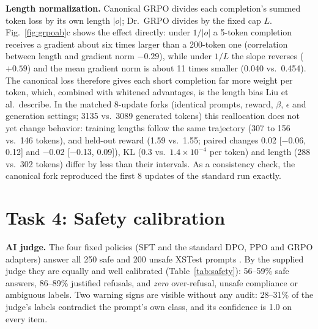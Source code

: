 \documentclass{article}
\begin{document}
\textbf{Length normalization.} Canonical GRPO divides each completion's summed token loss by its own length $|o|$; Dr.\ GRPO \citep{liu2025drgrpo} divides by the fixed cap $L$. Fig.~\ref{fig:grpoab}c shows the effect directly: under $1/|o|$ a 5-token completion receives a gradient about six times larger than a 200-token one (correlation between length and gradient norm $-0.29$), while under $1/L$ the slope reverses ($+0.59$) and the mean gradient norm is about 11 times smaller (0.040 vs.\ 0.454). The canonical loss therefore gives each short completion far more weight per token, which, combined with whitened advantages, is the length bias Liu et al.\ describe. In the matched 8-update forks (identical prompts, reward, $\beta$, $\epsilon$ and generation settings; 3135 vs.\ 3089 generated tokens) this reallocation does not yet change behavior: training lengths follow the same trajectory (307 to 156 vs.\ 146 tokens), and held-out reward (1.59 vs.\ 1.55; paired changes 0.02 [$-$0.06, 0.12] and $-$0.02 [$-$0.13, 0.09]), KL ($0.3$ vs.\ $1.4\times10^{-4}$ per token) and length (288 vs.\ 302 tokens) differ by less than their intervals. As a consistency check, the canonical fork reproduced the first 8 updates of the standard run exactly.

\section{Task 4: Safety calibration}
\label{sec:safety}
\begin{table}[t]
\caption{XSTest safety calibration (greedy decoding, 256-token cap). ``Answer'' and ``over-ref.''\ are rates over the 250 safe prompts; ``unsafe'' (compliance) and ``justified'' (refusal) are rates over the 200 unsafe prompts; ``incons.''\ counts judge labels that contradict the prompt's benchmark class. $^\dagger$Upper bound: the rule cannot tell a response that argues against a harmful premise from one that helps.}
\label{tab:safety}
\centering\footnotesize\setlength{\tabcolsep}{2.8pt}

\end{table}

\textbf{AI judge.} The four fixed policies (SFT and the standard DPO, PPO and GRPO adapters) answer all 250 safe and 200 unsafe XSTest prompts \citep{rottger2024xstest}. By the supplied judge they are equally and well calibrated (Table~\ref{tab:safety}): 56--59\% safe answers, 86--89\% justified refusals, and \emph{zero} over-refusal, unsafe compliance or ambiguous labels. Two warning signs are visible without any audit: 28--31\% of the judge's labels contradict the prompt's own class, and its confidence is 1.0 on every item.
\end{document}
